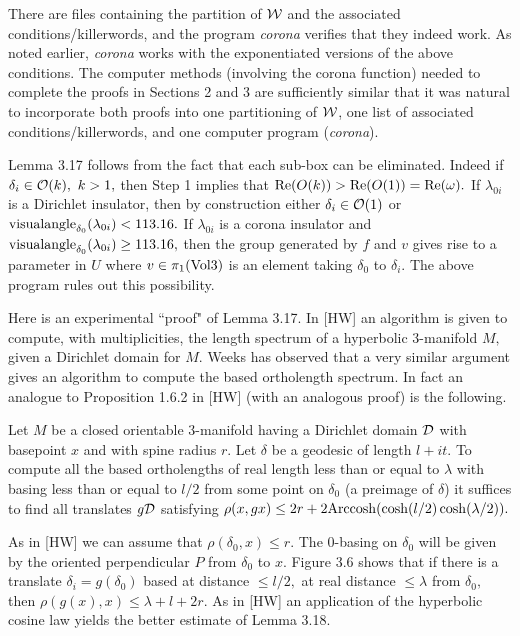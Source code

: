 There are files containing the partition of ${\cal W}$ and the associated conditions/killerwords, and the program {\it corona} verifies that they
indeed work.  As noted earlier, {\it corona} works with the exponentiated versions of the above conditions.
The computer methods (involving the corona function) 
needed to complete the proofs
in Sections 2 and 3 are sufficiently similar that it was 
natural to incorporate both proofs into one partitioning of ${\cal W}$,
one list of associated conditions/killerwords, and one computer
program ({\it corona}).

Lemma 3.17 follows from the fact that each 
sub-box can be eliminated.  Indeed
if $\delta_i \in {\cal O}(k),\ k>1,$ then  Step 1 implies that
${\rm Re}(O(k)) > {\rm Re}(O(1)) = {\rm Re}(\omega).$  
If $\lambda_{0i}$ is a Dirichlet insulator, then by
construction either $\delta_i \in {\cal O}(1)$ or 
${\rm visualangle}_{\delta_0}(\lambda_{0i}) < 113.16.$  
If $\lambda_{0i}$ is a corona
insulator and ${\rm visualangle}_{\delta_0}(\lambda_{0i})\ge 113.16,$ 
then the group generated by $f$ and $v$ gives rise to a parameter in $U$  
where $v\in
\pi_1({\rm Vol3})$ is an element taking $\delta_0$ to $\delta_i.$
The above program rules out this possibility.
\enddemo
 

Here is an experimental ``proof" of Lemma 3.17.  In [HW] an algorithm is given to
compute, with multiplicities,  the length spectrum of a hyperbolic 3-manifold $M,$
given a Dirichlet domain for $M.$   Weeks has observed that a very similar argument gives an algorithm to compute the
based ortholength spectrum.  In fact an analogue to Proposition 1.6.2 in [HW] (with an analogous proof) is the
following.

 Let $M$ be a closed orientable $3$\/{\rm -}\/manifold having a Dirichlet
domain $\cal D$ with basepoint $x$ and with spine radius $r.$  
Let $\delta$ be a geodesic of length $l+it.$  
To compute all the based ortholengths of real length less than or equal to
$\lambda$
with basing less than or equal to $l/2$ from some point on $\delta_0$ {\rm (}\/a preimage of $\delta${\rm )} it
suffices to find all translates $g\cal D$ satisfying $\rho(x,gx)\le
2r+2{\rm Arccosh}(\cosh(l/2)\cosh(\lambda/2)).$
\endproclaim

  As in [HW] we can assume that $\rho(\delta_0,x)\le r.$   The 0-basing on
$\delta_0$ will be given by the oriented perpendicular $P$ from $\delta_0$ to $x.$
Figure 3.6 shows that if there is a translate $\delta_i=g(\delta_0)$ based at
distance $ \le l/2,$ at real distance $\le \lambda$ from $\delta_0,$ then
$\rho(g(x),x)\le \lambda +l+2r$.  As in [HW] an application of the hyperbolic
cosine law yields the better estimate of Lemma 3.18.    \enddemo


